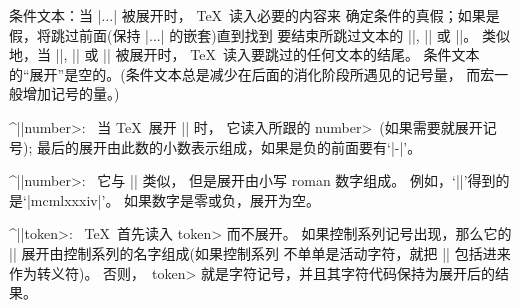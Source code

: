 {{{{{{{{%
\smallbreak
\textindent\bull 条件文本：\1当 |\if...| 被展开时， \TeX\ 读入必要的内容来%
确定条件的真假；如果是假，将跳过前面(保持 |\if...\fi| 的嵌套)直到找到%
要结束所跳过文本的 |\else|, |\or| 或 |\fi|。%
类似地，当 |\else|, |\or| 或 |\fi| 被展开时， \TeX\ 读入要跳过的任何文本的结尾。%
条件文本的``展开''是空的。(条件文本总是减少在后面的消化阶段所遇见的记号量，
而宏一般增加记号的量。)

\smallbreak
\textindent\bull ^|\number|\<number>: \ 当 \TeX\ 展开 |\number| 时，
它读入所跟的 \<number>~(如果需要就展开记号);
最后的展开由此数的小数表示组成，如果是负的前面要有`|-|'。

\smallbreak
\textindent\bull ^|\romannumeral|\<number>: \ 它与 |\number| 类似，
但是展开由小写 roman 数字组成。%
例如，`||'得到的是`|mcmlxxxiv|'。%
如果数字是零或负，展开为空。

\smallbreak
\textindent\bull ^|\string|\<token>: \  \TeX\ 首先读入 \<token> 而不展开。%
如果控制系列记号出现，那么它的 |\string| 展开由控制系列的名字组成(如果控制系列%
不单单是活动字符，就把 |\escapechar| 包括进来作为转义符)。%
否则，~\<token> 就是字符记号，并且其字符代码保持为展开后的结果。

}}}}}}}}
